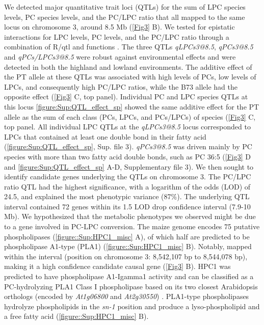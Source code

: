 We detected major quantitative trait loci (QTLs) for the sum of LPC species levels, PC species levels, and the PC/LPC ratio that all mapped to the same locus on chromosome 3, around 8.5 Mb (\autoref{Fig3} B). 
We tested for epistatic interactions for LPC levels, PC levels, and the PC/LPC ratio through a combination of R/qtl  and  functions \citep{broman2003-ac}.
The three QTLs \textit{qLPCs3@8.5}, \textit{qPCs3@8.5} and \textit{qPCs/LPCs3@8.5} were robust against environmental effects and were detected in both the highland and lowland environments.
The additive effect of the PT allele at these QTLs was associated with high levels of PCs, low levels of LPCs, and consequently high PC/LPC ratios, while the B73 allele had the opposite effect (\autoref{Fig3} C, top panel).
Individual PC and LPC species QTLs at this locus \autoref{figure:Sup:QTL_effect_sp} showed the same additive effect for the PT allele as the sum of each class (PCs, LPCs, and PCs/LPCs) of species (\autoref{Fig3} C, top panel. 
All individual LPC QTLs at the \textit{qLPCs3@8.5} locus corresponded to LPCs that contained at least one double bond in their fatty acid (\autoref{figure:Sup:QTL_effect_sp}, Sup. file 3).
\textit{qPCs3@8.5} was driven mainly by PC species with more than two fatty acid double bonds, such as PC 36:5 (\autoref{Fig3} D and \autoref{figure:Sup:QTL_effect_sp} A-D, Supplementary file 3).
We then sought to identify candidate genes underlying the QTLs on chromosome 3.
The PC/LPC ratio QTL had the highest significance, with a logarithm of the odds (LOD) of 24.5, and explained the most phenotypic variance (87\%). 
The underlying QTL interval contained 72 genes within its 1.5 LOD drop confidence interval (7.9-10 Mb). 
We hypothesized that the metabolic phenotypes we observed might be due to a gene involved in PC-LPC conversion.  
The maize genome encodes 75 putative phospholipases (\autoref{figure::Sup:HPC1_misc} A), of which half are predicted to be phospholipase A1-type (PLA1) (\autoref{figure::Sup:HPC1_misc} B).  
Notably, \hpc mapped within the interval (position on chromosome 3: 8,542,107 bp to 8,544,078 bp), making it a high confidence candidate causal gene (\autoref{Fig3} B). 
HPC1 was predicted to have phospholipase A1-Igamma1 activity and can be classified as a PC-hydrolyzing PLA1 Class I phospholipase based on its two closest Arabidopsis orthologs (encoded by \textit{At1g06800} and \textit{At2g30550}) \citep{ryu2004-iv}. 
PLA1-type phospholipases hydrolyze phospholipids in the \textit{sn-1} position and produce a lyso-phospholipid and a free fatty acid (\autoref{figure::Sup:HPC1_misc} B). 
